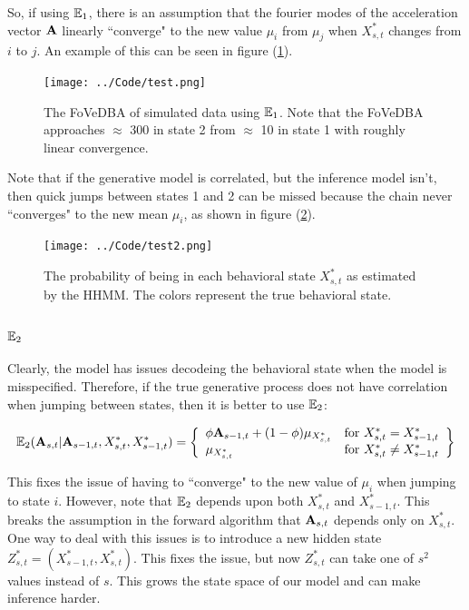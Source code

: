 So, if using $\mathbb{E}_1$, there is an assumption that the fourier modes of the acceleration vector $\mathbf{A}$ linearly ``converge" to the new value $\mu_i$ from $\mu_j$ when $X^*_{s,t}$ changes from $i$ to $j$. An example of this can be seen in figure (\ref{fig:FOVEDBA}).

 \begin{figure}[h!]
 	\centering
 	\texttt{[image: ../Code/test.png]}
 	\caption{The FoVeDBA of simulated data using $\mathbb{E}_1$. Note that the FoVeDBA approaches $\approx$ 300 in state 2 from $\approx$ 10 in state 1 with roughly linear convergence.}
 	\label{fig:FOVEDBA}
 \end{figure}
 
 Note that if the generative model is correlated, but the inference model isn't, then quick jumps between states 1 and 2 can be missed because the chain never ``converges" to the new mean $\mu_i$, as shown in figure (\ref{fig:STATE}).
 
\begin{figure}[h!]
	\centering
	\texttt{[image: ../Code/test2.png]}
	\caption{The probability of being in each behavioral state $X^*_{s,t}$ as estimated by the HHMM. The colors represent the true behavioral state.}
	\label{fig:STATE}
\end{figure}
 
 \subsubsection{$\mathbb{E}_2$}
 
Clearly, the model has issues decodeing the behavioral state when the model is misspecified. Therefore, if the true generative process does not have correlation when jumping between states, then it is better to use $\mathbb{E}_2$:

$$\mathbb{E}_2(\mathbf{A}_{s,t} | \mathbf{A}_{s-1,t}, X^*_{s,t}, X^*_{s-1,t}) = \left\{\begin{array}{lr}
\phi \mathbf{A}_{s-1,t} + (1-\phi) \mu_{X^*_{s,t}} & \text{for } X^*_{s,t} = X^*_{s-1,t}\\
\mu_{X^*_{s,t}} & \text{for } X^*_{s,t} \neq X^*_{s-1,t}
\end{array}\right\}$$

This fixes the issue of having to ``converge" to the new value of $\mu_i$ when jumping to state $i$. However, note that $\mathbb{E}_2$ depends upon both $X^*_{s,t}$ and $X^*_{s-1,t}$. This breaks the assumption in the forward algorithm that $\mathbf{A}_{s,t}$ depends only on $X^*_{s,t}$. One way to deal with this issues is to introduce a new hidden state $Z^*_{s,t} = (X^*_{s-1,t},X^*_{s,t})$. This fixes the issue, but now $Z^*_{s,t}$ can take one of $s^2$ values instead of $s$. This grows the state space of our model and can make inference harder.
 
